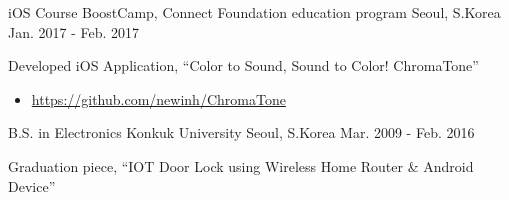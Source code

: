 

\begin{cventries}

  \cventry
    {{\selectfont iOS} Course} %
    {BoostCamp, Connect Foundation education program} %
    {Seoul, S.Korea} %
    {Jan. 2017 - Feb. 2017} %
    {
      \begin{cvitems} %
        \item {Developed iOS Application, ``Color to Sound, Sound to Color! ChromaTone''}
        \begin{itemize}
          \item {\url{https://github.com/newinh/ChromaTone}}
        \end{itemize}
      \end{cvitems}
    }

  \cventry
    {B.S. in Electronics} %
    {Konkuk University} %
    {Seoul, S.Korea} %
    {Mar. 2009 - Feb. 2016} %
    {
      \begin{cvitems} %
        \item {Graduation piece, ``IOT Door Lock using Wireless Home Router \& Android Device''}
      \end{cvitems}
    }

\end{cventries}
